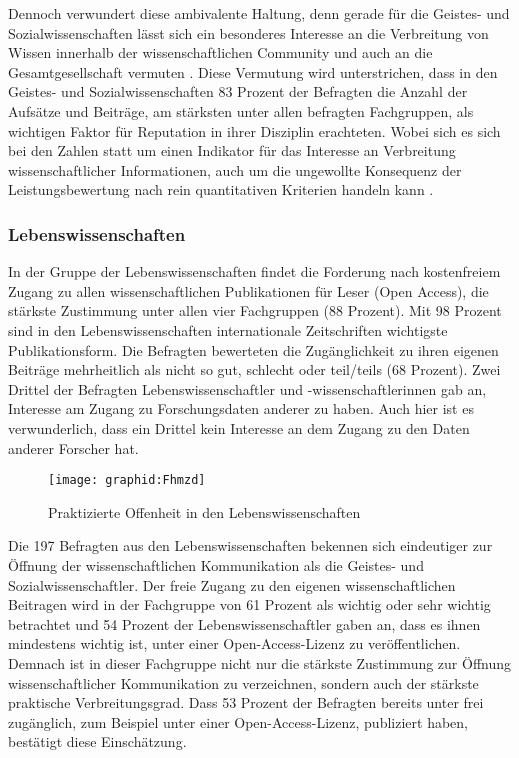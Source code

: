 Dennoch verwundert diese ambivalente Haltung, denn gerade für die Geistes- und Sozialwissenschaften lässt sich ein besonderes Interesse an die Verbreitung von Wissen innerhalb der wissenschaftlichen Community und auch an die Gesamtgesellschaft vermuten \cite{suchen}. Diese Vermutung wird unterstrichen, dass in den Geistes- und Sozialwissenschaften 83 Prozent der Befragten die Anzahl der Aufsätze und Beiträge, am stärksten unter allen befragten Fachgruppen, als wichtigen Faktor für Reputation in ihrer Disziplin erachteten. Wobei sich es sich bei den Zahlen statt um einen Indikator für das Interesse an Verbreitung wissenschaftlicher Informationen, auch um die ungewollte Konsequenz der Leistungsbewertung nach rein quantitativen Kriterien handeln kann \cite{wr_2015_wissenschaft_integritaet}.

\subsubsection{Lebenswissenschaften}

In der Gruppe der Lebenswissenschaften findet die Forderung nach kostenfreiem Zugang zu allen wissenschaftlichen Publikationen für Leser (Open Access), die stärkste Zustimmung unter allen vier Fachgruppen (88 Prozent). Mit 98 Prozent sind in den Lebenswissenschaften internationale Zeitschriften wichtigste Publikationsform. Die Befragten bewerteten die Zugänglichkeit zu ihren eigenen Beiträge mehrheitlich als nicht so gut, schlecht oder teil/teils (68 Prozent). Zwei Drittel der Befragten Lebenswissenschaftler und -wissenschaftlerinnen gab an, Interesse am Zugang zu Forschungsdaten anderer zu haben. Auch hier ist es verwunderlich, dass ein Drittel kein Interesse an dem Zugang zu den Daten anderer Forscher hat.

\begin{figure}[h!]
\texttt{[image: graphid:Fhmzd]}
\caption{Praktizierte Offenheit in den Lebenswissenschaften}
\end{figure}

Die 197 Befragten aus den Lebenswissenschaften bekennen sich eindeutiger zur Öffnung der wissenschaftlichen Kommunikation als die Geistes- und Sozialwissenschaftler. Der freie Zugang zu den eigenen wissenschaftlichen Beitragen wird in der Fachgruppe von 61 Prozent als wichtig oder sehr wichtig betrachtet und 54 Prozent der Lebenswissenschaftler gaben an, dass es ihnen mindestens wichtig ist, unter einer Open-Access-Lizenz zu veröffentlichen. Demnach ist in dieser Fachgruppe nicht nur die stärkste Zustimmung zur Öffnung wissenschaftlicher Kommunikation zu verzeichnen, sondern auch der stärkste praktische Verbreitungsgrad. Dass 53 Prozent der Befragten bereits unter frei zugänglich, zum Beispiel unter einer Open-Access-Lizenz, publiziert haben, bestätigt diese Einschätzung.

